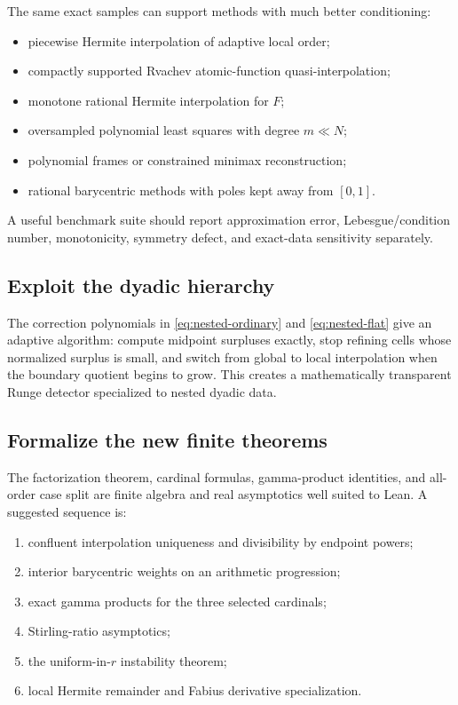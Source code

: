 \documentclass[11pt,oneside]{article}
\theoremstyle{definition}
\theoremstyle{remark}
\begin{document}
The same exact samples can support methods with much better conditioning:

\begin{itemize}
\item piecewise Hermite interpolation of adaptive local order;
\item compactly supported Rvachev atomic-function quasi-interpolation;
\item monotone rational Hermite interpolation for $F$;
\item oversampled polynomial least squares with degree $m\ll N$;
\item polynomial frames or constrained minimax reconstruction;
\item rational barycentric methods with poles kept away from $[0,1]$.
\end{itemize}

A useful benchmark suite should report approximation error, Lebesgue/condition number,
monotonicity, symmetry defect, and exact-data sensitivity separately.

\subsection{Exploit the dyadic hierarchy}

The correction polynomials in \eqref{eq:nested-ordinary} and \eqref{eq:nested-flat} give an
adaptive algorithm: compute midpoint surpluses exactly, stop refining cells whose normalized
surplus is small, and switch from global to local interpolation when the boundary quotient
begins to grow.  This creates a mathematically transparent Runge detector specialized to
nested dyadic data.

\subsection{Formalize the new finite theorems}

The factorization theorem, cardinal formulas, gamma-product identities, and all-order case
split are finite algebra and real asymptotics well suited to Lean.  A suggested sequence is:

\begin{enumerate}
\item confluent interpolation uniqueness and divisibility by endpoint powers;
\item interior barycentric weights on an arithmetic progression;
\item exact gamma products for the three selected cardinals;
\item Stirling-ratio asymptotics;
\item the uniform-in-$r$ instability theorem;
\item local Hermite remainder and Fabius derivative specialization.
\end{enumerate}
\end{document}
